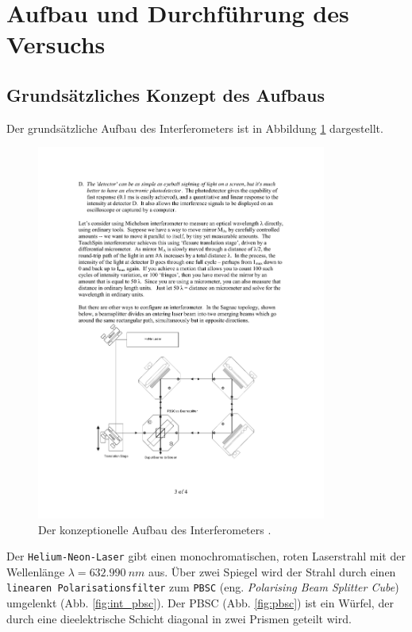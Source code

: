 \section{Aufbau und Durchführung des Versuchs}
\subsection{Grundsätzliches Konzept des Aufbaus}
Der grundsätzliche Aufbau des Interferometers ist in Abbildung \ref{fig:interferometer_aufbau} dargestellt.
\begin{figure}[h!]
  \centering
  \includegraphics[width=0.85\textwidth]{content/images/interferometer_aufbau.pdf}
  \caption{Der konzeptionelle Aufbau des Interferometers \cite{teachspin}.}
  \label{fig:interferometer_aufbau}
\end{figure}
Der \texttt{Helium-Neon-Laser} gibt einen monochromatischen, roten Laserstrahl mit der Wellenlänge $\lambda = \SI{632.990}{nm}$ \cite{anleitung} aus.
Über zwei Spiegel wird der Strahl durch einen \texttt{linearen Polarisationsfilter} zum \texttt{PBSC} (eng. \textit{Polarising Beam Splitter Cube}) umgelenkt (Abb. \ref{fig:int_pbsc}).
Der PBSC (Abb. \ref{fig:pbsc}) ist ein Würfel, der durch eine dieelektrische Schicht diagonal in zwei Prismen geteilt wird.
